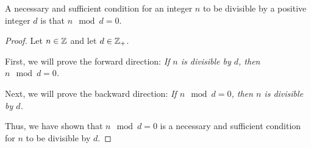 \begin{theorem}
    A necessary and sufficient condition for an integer $n$ to be divisible by a
    positive integer $d$ is that $n \mod d = 0$.
\end{theorem}
\begin{proof}
    Let $n \in {\mathbb Z}$ and let $d \in {\mathbb Z}_{+}$.

    First, we will prove the forward direction: \emph{If $n$ is divisible by
    $d$, then $n \mod d = 0$.}
    \proofspace

    Next, we will prove the backward direction: \emph{If $n \mod d = 0$,
    then $n$ is divisible by $d$.}
    \proofspace

    Thus, we have shown that $n \mod d = 0$ is a necessary and sufficient
    condition for $n$ to be divisible by $d$.
\end{proof}
